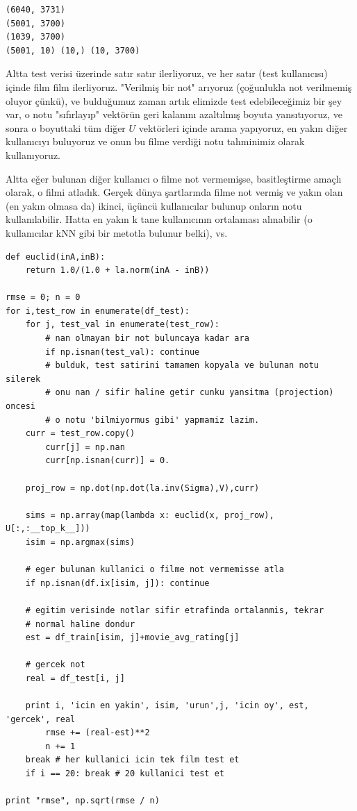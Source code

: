 \documentclass[12pt,fleqn]{article}\usepackage{../../common}
\begin{document}
\begin{verbatim}
(6040, 3731)
(5001, 3700)
(1039, 3700)
(5001, 10) (10,) (10, 3700)
\end{verbatim}

Altta test verisi üzerinde satır satır ilerliyoruz, ve her satır (test
kullanıcısı) içinde film film ilerliyoruz. "Verilmiş bir not" arıyoruz
(çoğunlukla not verilmemiş oluyor çünkü), ve bulduğumuz zaman artık
elimizde test edebileceğimiz bir şey var, o notu "sıfırlayıp" vektörün
geri kalanını azaltılmış boyuta yansıtıyoruz, ve sonra o boyuttaki tüm
diğer $U$ vektörleri içinde arama yapıyoruz, en yakın diğer
kullanıcıyı buluyoruz ve onun bu filme verdiği notu tahminimiz olarak
kullanıyoruz.

Altta eğer bulunan diğer kullanıcı o filme not vermemişse, basitleştirme
amaçlı olarak, o filmi atladık. Gerçek dünya şartlarında filme not vermiş
ve yakın olan (en yakın olmasa da) ikinci, üçüncü kullanıcılar bulunup
onların notu kullanılabilir. Hatta en yakın k tane kullanıcının ortalaması
alınabilir (o kullanıcılar kNN gibi bir metotla bulunur belki), vs.

\begin{verbatim}
def euclid(inA,inB):
    return 1.0/(1.0 + la.norm(inA - inB))
    
rmse = 0; n = 0
for i,test_row in enumerate(df_test):
    for j, test_val in enumerate(test_row):
        # nan olmayan bir not buluncaya kadar ara
        if np.isnan(test_val): continue	
        # bulduk, test satirini tamamen kopyala ve bulunan notu silerek
        # onu nan / sifir haline getir cunku yansitma (projection) oncesi
        # o notu 'bilmiyormus gibi' yapmamiz lazim. 
	curr = test_row.copy()
        curr[j] = np.nan
        curr[np.isnan(curr)] = 0.

	proj_row = np.dot(np.dot(la.inv(Sigma),V),curr)

	sims = np.array(map(lambda x: euclid(x, proj_row), U[:,:__top_k__]))
	isim = np.argmax(sims)

	# eger bulunan kullanici o filme not vermemisse atla
	if np.isnan(df.ix[isim, j]): continue

	# egitim verisinde notlar sifir etrafinda ortalanmis, tekrar
	# normal haline dondur
	est = df_train[isim, j]+movie_avg_rating[j]

	# gercek not
	real = df_test[i, j]

	print i, 'icin en yakin', isim, 'urun',j, 'icin oy', est, 'gercek', real
        rmse += (real-est)**2
        n += 1
	break # her kullanici icin tek film test et
    if i == 20: break # 20 kullanici test et

print "rmse", np.sqrt(rmse / n)
\end{verbatim}
\end{document}
